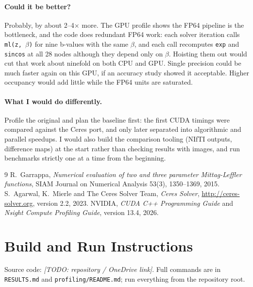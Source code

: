\documentclass[11pt]{article}
\begin{document}
\paragraph{Could it be better?} Probably, by about 2--4$\times$ more. The GPU profile shows the FP64
pipeline is the bottleneck, and the code does redundant FP64 work: each solver iteration calls
\texttt{ml(z, $\beta$)} for nine b-values with the same $\beta$, and each call recomputes
\texttt{exp} and \texttt{sincos} at all 28 nodes although they depend only on $\beta$. Hoisting them
out would cut that work about ninefold on both CPU and GPU. Single precision could be much faster
again on this GPU, if an accuracy study showed it acceptable. Higher occupancy would add little
while the FP64 units are saturated.

\paragraph{What I would do differently.} Profile the original and plan the baseline first: the
first CUDA timings were compared against the Ceres port, and only later separated into
algorithmic and parallel speedups. I would also build the comparison tooling (NIfTI outputs,
difference maps) at the start rather than checking results with images, and run benchmarks
strictly one at a time from the beginning.

\begin{thebibliography}{9}
 R.~Garrappa, \emph{Numerical evaluation of two and three parameter
    Mittag-Leffler functions}, SIAM Journal on Numerical Analysis 53(3), 1350--1369, 2015.
 S.~Agarwal, K.~Mierle and The Ceres Solver Team, \emph{Ceres Solver},
    \url{http://ceres-solver.org}, version 2.2, 2023.
 NVIDIA, \emph{CUDA C++ Programming Guide} and \emph{Nsight Compute Profiling Guide},
    version 13.4, 2026.
\end{thebibliography}

\newpage
\appendix

\section{Build and Run Instructions}

Source code: \textit{[TODO: repository / OneDrive link]}. Full commands are in \texttt{RESULTS.md}
and \texttt{profiling/README.md}; run everything from the repository root.
\end{document}

